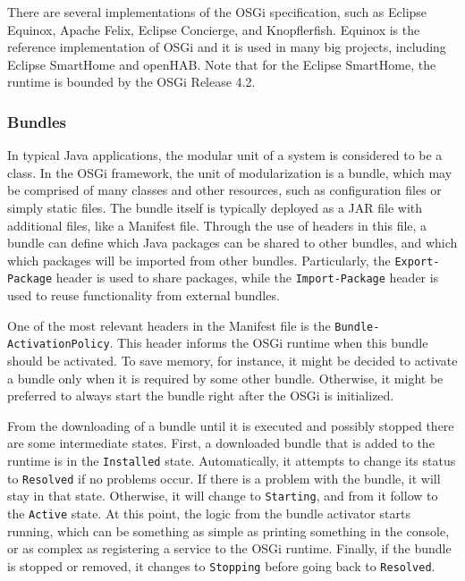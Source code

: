 \documentclass[12pt]{article}
\begin{document}
There are several implementations of the OSGi specification, such as Eclipse Equinox, Apache Felix, Eclipse Concierge, and Knopflerfish. Equinox is the reference implementation of OSGi and it is used in many big projects, including Eclipse SmartHome and openHAB. Note that for the Eclipse SmartHome, the runtime is bounded by the OSGi Release 4.2. 

\subsubsection{Bundles}

In typical Java applications, the modular unit of a system is considered to be a class. In the OSGi framework, the unit of modularization is a bundle, which may be comprised of many classes and other resources, such as configuration files or simply static files. The bundle itself is typically deployed as a JAR file with additional files, like a Manifest file. Through the use of headers in this file, a bundle can define which Java packages can be shared to other bundles, and which which packages will be imported from other bundles. Particularly, the \texttt{Export-Package} header is used to share packages, while the \texttt{Import-Package} header is used to reuse functionality from external bundles.

One of the most relevant headers in the Manifest file is the \texttt{Bundle-ActivationPolicy}. This header informs the OSGi runtime when this bundle should be activated. To save memory, for instance, it might be decided to activate a bundle only when it is required by some other bundle. Otherwise, it might be preferred to always start the bundle right after the OSGi is initialized. 

From the downloading of a bundle until it is executed and possibly stopped there are some intermediate states. First, a downloaded bundle that is added to the runtime is in the \texttt{Installed} state. Automatically, it attempts to change its status to \texttt{Resolved} if no problems occur. If there is a problem with the bundle, it will stay in that state. Otherwise, it will change to \texttt{Starting}, and from it follow to the \texttt{Active} state. At this point, the logic from the bundle activator starts running, which can be something as simple as printing something in the console, or as complex as registering a service to the OSGi runtime. Finally, if the bundle is stopped or removed, it changes to \texttt{Stopping} before going back to \texttt{Resolved}.
\end{document}
